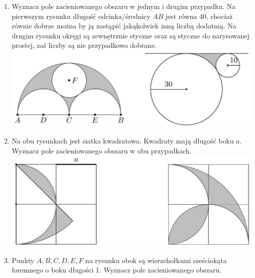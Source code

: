 \documentclass[10pt]{article}
\begin{document}
\begin{enumerate}
  \item Wyznacz pole zacieniowanego obszaru w jednym i drugim przypadku. Na pierwszym rysunku długość odcinka/średnicy \(A B\) jest równa 40, chociaż równie dobrze można by ją zastąpić jakąkolwiek inną liczbą dodatnią. Na drugim rysunku okręgi są zewnętrznie styczne oraz są styczne do narysowanej prostej, zaś liczby są nie przypadkowo dobrane.\\
\includegraphics[max width=\textwidth, center]{2024_11_21_e9b4faa005d5be2cc318g-065(2)}
  \item Na obu rysunkach jest siatka kwadratowa. Kwadraty mają długość boku \(a\). Wyznacz pole zacieniowanego obszaru w obu przypadkach.\\
\includegraphics[max width=\textwidth, center]{2024_11_21_e9b4faa005d5be2cc318g-065}
  \item Punkty \(A, B, C, D, E, F\) na rysunku obok są wierzchołkami sześciokąta foremnego o boku długości 1. Wyznacz pole zacieniowanego obszaru.\\

\end{enumerate}
\end{document}
